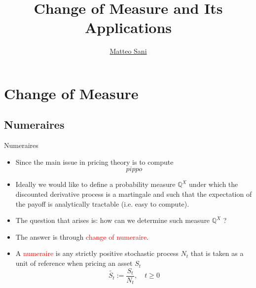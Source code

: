\documentclass{beamer}
\title{Change of Measure and Its Applications}
\author{\href{mailto:matteo.sani@unisi.it}{Matteo Sani}}
\begin{document}
\begin{frame}[plain]
  \maketitle
\end{frame}

\section{Change of Measure}

\subsection{Numeraires}
\begin{frame}{Numeraires}
  \begin{itemize}
  \item<1-> Since the main issue in pricing theory is to compute
  \begin{equation*}
  	pippo
  \end{equation*}
  \item<2-> Ideally we would like to define a probability measure $\mathbb{Q}^X$ under which the discounted derivative process is a martingale and such that the expectation of the payoff is analytically tractable (i.e. easy to compute).
  \item<3-> The question that arises is: how can we determine such measure $\mathbb{Q}^X$ ?
  \item<4-> The answer is through \textcolor{red}{change of numeraire}.
  \item<5-> A \textcolor{red}{numeraire} is any strictly positive stochastic process $N_t$ that is taken as a unit of reference when pricing an asset $S_t$
    \begin{equation*}
      \tilde{S_t}:=\frac{S_t}{N_t}, \quad t \ge 0
    \end{equation*}
  \end{itemize}
\end{frame}
\end{document}
